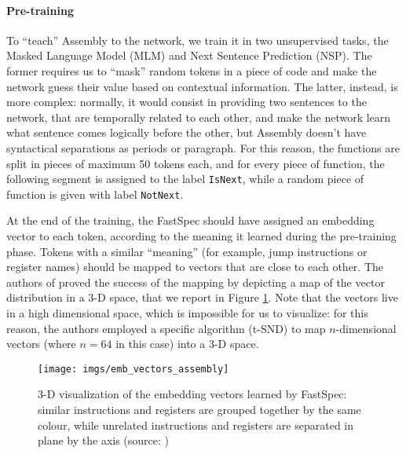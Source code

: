 \documentclass[target=mst,aauheader=aics]{thud}
\theoremstyle{definition}
\begin{document}
	\paragraph{Pre-training} To ``teach'' Assembly to the network, we train it in two unsupervised tasks, the Masked Language Model (MLM) and Next Sentence Prediction (NSP). The former requires us to ``mask'' random tokens in a piece of code and make the network guess their value based on contextual information. The latter, instead, is more complex: normally, it would consist in providing two sentences to the network, that are temporally related to each other, and make the network learn what sentence comes logically before the other, but Assembly doesn't have syntactical separations as periods or paragraph. For this reason, the functions are split in pieces of maximum 50 tokens each, and for every piece of function, the following segment is assigned to the label \texttt{IsNext}, while a random piece of function is given with label \texttt{NotNext}.
	
	At the end of the training, the FastSpec should have assigned an embedding vector to each token, according to the meaning it learned during the pre-training phase. Tokens with a similar ``meaning'' (for example, jump instructions or register names) should be mapped to vectors that are close to each other. The authors of \cite{Tol2021} proved the success of the mapping by depicting a map of the vector distribution in a 3-D space, that we report in Figure \ref{fig:emb_vec}. Note that the vectors live in a high dimensional space, which is impossible for us to visualize: for this reason, the authors employed a specific algorithm (t-SND) to map $n$-dimensional vectors (where $n = 64$ in this case) into a 3-D space.
	
	\begin{figure}
		\centering
		\texttt{[image: imgs/emb\_vectors\_assembly]}
		\captionsetup{width=.7\linewidth}
		\caption{3-D visualization of the embedding vectors learned by FastSpec: similar instructions and registers are grouped together by the same colour, while unrelated instructions and registers are separated in plane by the axis (source: \cite{Tol2021})}
		\label{fig:emb_vec}
	\end{figure}
	
\end{document}
